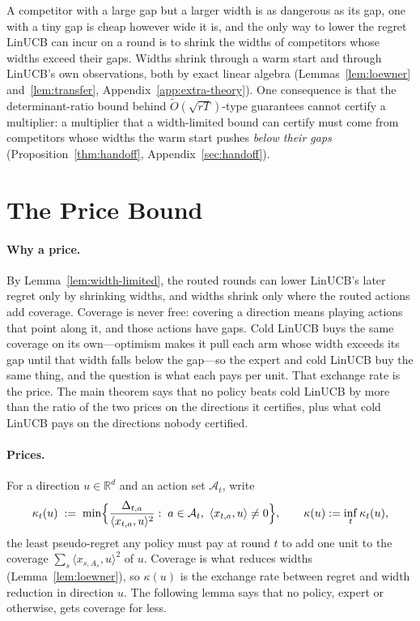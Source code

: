 \documentclass{article}
\theoremstyle{definition}
\theoremstyle{remark}
\newcommand{\R}{\mathbb{R}}
\theoremstyle{remark}
\begin{document}
A competitor with a large gap but a larger width is as dangerous as its gap,
one with a tiny gap is cheap however wide it is, and the only way to lower the
regret LinUCB can incur on a round is to shrink the widths of competitors
whose widths exceed their gaps. Widths shrink through a warm start and through
LinUCB's own observations, both by exact linear algebra
(Lemmas~\ref{lem:loewner} and~\ref{lem:transfer},
Appendix~\ref{app:extra-theory}). One consequence is that the
determinant-ratio bound behind $\widetilde O(\sqrt{rT})$-type guarantees
cannot certify a multiplier: a multiplier that a width-limited bound can
certify must come from competitors whose widths the warm start pushes
\emph{below their gaps}
(Proposition~\ref{thm:handoff}, Appendix~\ref{sec:handoff}).

\section{The Price Bound}
\label{sec:price}

\paragraph{Why a price.}
By Lemma~\ref{lem:width-limited}, the routed rounds can lower LinUCB's later
regret only by shrinking widths, and widths shrink only where the routed
actions add coverage. Coverage is never free: covering a direction means
playing actions that point along it, and those actions have gaps. Cold
LinUCB buys the same coverage on its own---optimism makes it pull each arm
whose width exceeds its gap until that width falls below the gap---so the
expert and cold LinUCB buy the same thing, and the question is what each pays
per unit. That exchange rate is the price. The main theorem says that no
policy beats cold LinUCB by more than the ratio of the two prices on the
directions it certifies, plus what cold LinUCB pays on the directions nobody
certified.

\paragraph{Prices.}
For a direction $u\in\R^d$ and an
action set $\mathcal A_t$, write
\begin{equation}
\label{eq:price}
\kappa_t(u)\;:=\;\min\Bigl\{\frac{\Delta_{t,a}}{\langle x_{t,a},u\rangle^2}:\;a\in\mathcal A_t,\ \langle x_{t,a},u\rangle\neq0\Bigr\},
\qquad \kappa(u):=\inf_t\kappa_t(u),
\end{equation}
the least pseudo-regret any policy must pay at round $t$ to add one unit to
the coverage $\sum_s\langle x_{s,A_s},u\rangle^2$ of $u$. Coverage is what
reduces widths (Lemma~\ref{lem:loewner}), so $\kappa(u)$ is the exchange rate
between regret and width reduction in direction $u$. The following lemma
says that no policy, expert or otherwise, gets coverage for less.
\end{document}
